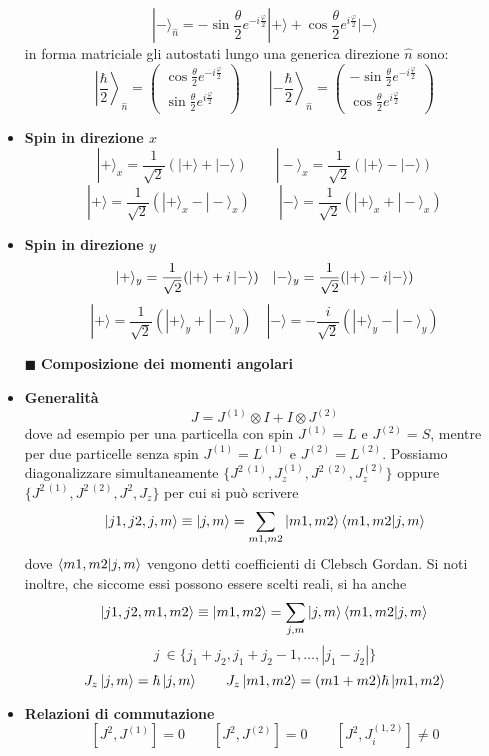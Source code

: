\documentclass{book}
\newcommand{\g}{\textbf}
\newcommand{\e}{\begin{equation}}
\newcommand{\ex}{\end{equation} }
\renewcommand{\it}{\item[$\cdot$]}
\begin{document}
\begin{multicols}{4}
\begin{itemize}
    \e{|-\rangle_{\hat{n}} = -\sin\frac{\theta}{2} e^{-i\frac{\varphi}{2}} |+\rangle + \cos\frac{\theta}{2} e^{i\frac{\varphi}{2}} |-\rangle} \ex
in forma matriciale gli autostati lungo una generica direzione $\hat{n}$ sono:
    \e{\left|\frac{\hbar}{2}\right\rangle_{\hat{n}} =
    \begin{pmatrix}
        \cos\frac{\theta}{2} e^{-i\frac{\varphi}{2}} \\
        \sin\frac{\theta}{2} e^{i\frac{\varphi}{2}}
    \end{pmatrix} \qquad \left|-\frac{\hbar}{2}\right\rangle_{\hat{n}} =
    \begin{pmatrix}
        -\sin\frac{\theta}{2} e^{-i\frac{\varphi}{2}} \\
        \cos\frac{\theta}{2} e^{i\frac{\varphi}{2}}
    \end{pmatrix}} \ex
\it \g{Spin in direzione $x$}
    \e{|+\rangle_x = \frac{1}{\sqrt{2}}(|+\rangle + |-\rangle) \qquad |-\rangle_x = \frac{1}{\sqrt{2}}(|+\rangle - |-\rangle)} \ex
    \e{|+\rangle = \frac{1}{\sqrt{2}}(|+\rangle_x - |-\rangle_x) \qquad |-\rangle = \frac{1}{\sqrt{2}}(|+\rangle_x + |-\rangle_x)} \ex
\it \g{Spin in direzione $y$}
    \e{|+\rangle_y = \frac{1}{\sqrt{2}}(\ket{+} + i\ket{-}) \quad |-\rangle_y = \frac{1}{\sqrt{2}}(|+\rangle -i|-\rangle)} \ex
    \e{|+\rangle = \frac{1}{\sqrt{2}}(|+\rangle_y + |-\rangle_y) \quad |-\rangle = -\frac{i}{\sqrt{2}}(|+\rangle_y - |-\rangle_y)} \ex
\item [$\blacksquare$] \g{Composizione dei momenti angolari}
    \it \g{Generalità}
        \e{J = J^{(1)} \otimes I + I \otimes J^{(2)}} \ex
        dove ad esempio per una particella con spin $J^{(1)} = L$ e $J^{(2)} = S$, mentre per due particelle senza spin $J^{(1)} = L^{(1)}$ e $J^{(2)} = L^{(2)}$. Possiamo diagonalizzare simultaneamente $\{J^{2 \ (1)}, J^{(1)}_z,J^{2 \ (2)}, J^{(2)}_z\}$ oppure $\{J^{2 \ (1)}, J^{2 \ (2)}, J^{2},J_{z}\}$ per cui si può scrivere
        \e{\ket{j1,j2,j,m} \equiv \ket{j,m} = \sum_{m1,m2}\ket{m1,m2}\braket{m1,m2}{j,m}}\ex
        dove $\braket{m1,m2}{j,m}$ vengono detti coefficienti di Clebsch Gordan. Si noti inoltre, che siccome essi possono essere scelti reali, si ha anche 
        \e{\ket{j1,j2,m1,m2} \equiv \ket{m1,m2} = \sum_{j,m} \ket{j,m}\braket{m1,m2}{j,m}}\ex 
         \e{j \ \in \{j_{1} + j_{2}, j_{1} + j_{2} - 1, \dots, |j_{1}-j_{2}|\}}\ex
        \e{J_{z}\ket{j,m} = \hbar \ket{j,m} \qquad J_{z}\ket{m1,m2} = (m1 + m2)\hbar \ket{m1,m2}}\ex
    \it \g{Relazioni di commutazione}
        \e{[J^2, J^{(1)}] = 0 \qquad [J^2, J^{(2)}] = 0 \qquad [J^2, J^{(1,2)}_i] \neq 0} \ex

\end{itemize}
\end{multicols}
\end{document}

